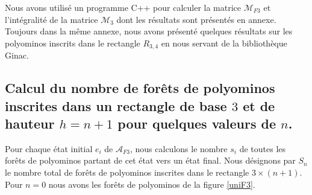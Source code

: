  
 Nous avons utilisé un programme C++ pour calculer la matrice $\mathcal{M}_{F3}$ et l'intégralité de la matrice $\mathcal{M}_{3}$ dont les résultats sont présentés en annexe. Toujours dans la même annexe, nous avons présenté quelques résultats sur les  polyominos inscrits dans le rectangle $R_{3,4}$ en nous servant de la bibliothèque Ginac.
 \begin{spacing}{0.30}
\section{Calcul du nombre de forêts de polyominos inscrites dans un rectangle de base $3$ et de hauteur $h=n+1$ pour quelques valeurs de $n$. }
\end{spacing}
Pour chaque état initial $e_{i}$ de $\mathcal{A}_{F3}$, nous calculons le nombre $s_{i}$ de toutes les forêts de polyominos partant de cet état vers un état final. Nous désignons par $S_{n}$ le nombre total de forêts de polyominos inscrites dans le rectangle $3\times (n+1)$. Pour $n=0$  nous avons les forêts de polyominos de la figure \ref{uniF3}.
 
